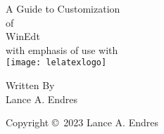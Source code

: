 
\hypersetup{pageanchor=false}
\begin{titlepage}
\thispagestyle{ledateinfooter}
\begin{center}
\bfseries

\LARGE A Guide to Customization\\
\Normal of\\
\LARGE WinEdt\\
\Normal with emphasis of use with\\
\vspace{10pt}
\texttt{[image: lelatexlogo]}\\


\vfill

\large Written By\\
\Large Lance A. Endres\\

\vfill

\normalsize Copyright \copyright\ 2023 Lance A. Endres

\end{center}
\end{titlepage}

\hypersetup{pageanchor=true} 